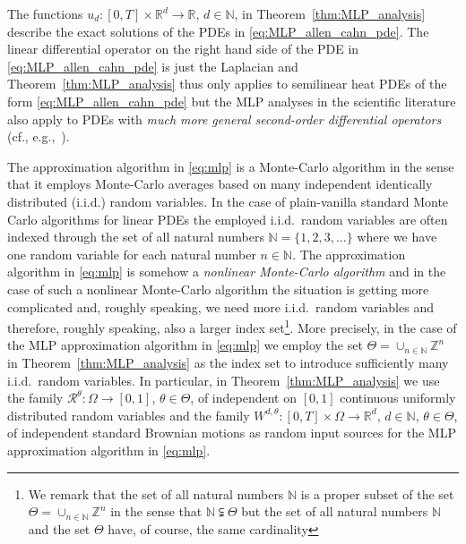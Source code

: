 \documentclass[12pt]{article}
\theoremstyle{definition}
\newcommand{\R}{\mathbb{R}}
\newcommand{\Z}{\mathbb{Z}}
\newcommand{\N}{\mathbb{N}}
\begin{document}
The functions $ u_d \colon [0,T] \times \R^d \to \R $, $ d \in \N $, 
in Theorem~\ref{thm:MLP_analysis} 
describe the exact solutions of the PDEs in \eqref{eq:MLP_allen_cahn_pde}. 
%
%
The linear differential operator on the 
right hand side of the PDE in 
\eqref{eq:MLP_allen_cahn_pde} 
is just the Laplacian and 
Theorem~\ref{thm:MLP_analysis} thus only applies to 
semilinear heat PDEs of the form \eqref{eq:MLP_allen_cahn_pde} 
but the MLP analyses in the scientific literature 
also apply to PDEs with 
\emph{much more general second-order differential operators} 
(cf., e.g.,~\cite{hutzenthaler2020lipschitz,
hutzenthaler2019arxiv1903}). 



The approximation algorithm in \eqref{eq:mlp} is a Monte-Carlo algorithm in the sense 
that it employs Monte-Carlo averages based on many independent identically distributed (i.i.d.) 
random variables. In the case of plain-vanilla standard Monte Carlo algorithms 
for linear PDEs the employed i.i.d.\ random variables are often indexed 
through the set of all natural numbers $ \N = \{ 1, 2, 3, \dots \} $ 
where we have one random variable for each natural number $ n \in \N $. 
The approximation algorithm in \eqref{eq:mlp} is somehow a \emph{nonlinear Monte-Carlo algorithm} 
and in the case of such a nonlinear Monte-Carlo algorithm the situation is getting more 
complicated and, roughly speaking, we need more i.i.d.\ random variables and 
therefore, roughly speaking, also a larger index set\footnote{We remark that the set of all natural numbers $ \N $ 
is a proper subset of the set $ \Theta = \cup_{ n \in \N } \Z^n $ in the sense that $ \N \subsetneqq \Theta $ but 
the set of all natural numbers $ \N $ 
and the set $ \Theta $ have, of course, the same cardinality}. More precisely, 
in the case of the MLP approximation algorithm in \eqref{eq:mlp} we employ the 
set $ \Theta = \cup_{ n \in \N } \Z^n $ in Theorem~\ref{thm:MLP_analysis} 
as the index set to introduce sufficiently many i.i.d.\ random variables. 
In particular, in Theorem~\ref{thm:MLP_analysis} we use 
the family $ \mathcal{R}^{ \theta } \colon \Omega \to [0,1] $,
$ \theta \in \Theta $, of independent 
on $ [0,1] $ continuous uniformly distributed random variables 
and the family 
$ W^{ d, \theta } \colon [0,T] \times \Omega \to \R^d $, 
$ d \in \N $,
$ \theta \in \Theta $, 
of independent standard Brownian motions 
as random input sources for the MLP approximation algorithm 
in \eqref{eq:mlp}. 
\end{document}
